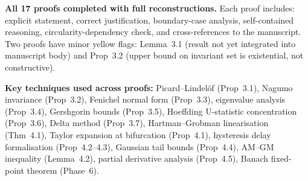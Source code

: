 \noindent\textbf{All 17 proofs completed with full reconstructions.}
Each proof includes: explicit statement, correct justification, boundary-case
analysis, self-contained reasoning, circularity-dependency check, and
cross-references to the manuscript. Two proofs have minor yellow flags:
Lemma~3.1 (result not yet integrated into manuscript body) and Prop~3.2
(upper bound on invariant set is existential, not constructive).

\vspace{2mm}
\noindent\textbf{Key techniques used across proofs:}
Picard--Lindel\"{o}f (Prop~3.1), Nagumo invariance (Prop~3.2),
Fenichel normal form (Prop~3.3), eigenvalue analysis (Prop~3.4),
Gershgorin bounds (Prop~3.5), Hoeffding U-statistic concentration
(Prop~3.6), Delta method (Prop~3.7), Hartman--Grobman linearisation
(Thm~4.1), Taylor expansion at bifurcation (Prop~4.1),
hysteresis delay formalisation (Prop~4.2--4.3), Gaussian tail bounds
(Prop~4.4), AM--GM inequality (Lemma~4.2), partial derivative analysis
(Prop~4.5), Banach fixed-point theorem (Phase~6).
